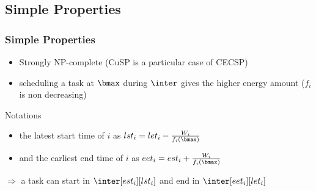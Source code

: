 \subsection{Simple Properties}
\begin{frame}
  \frametitle{Simple Properties}
  \begin{itemize}
\vfill
  \item Strongly NP-complete (CuSP is a particular case of CECSP)
\vfill
\pause
  \item scheduling a task at $\bmax$ during $\inter$ gives the higher energy amount ($f_i$ is non decreasing)
\vfill
\end{itemize}
\begin{center}
\end{center}
\pause
\vfill
  \begin{block}{Notations}
    \begin{itemize}
    \item the latest start time of $i$ as $lst_i=let_i-\frac{W_i}{f_i(\bmax)}$
    \item and the earliest end time of $i$ as $eet_i=est_i+\frac{W_i}{f_i(\bmax)}$
    \end{itemize}
  \end{block}
\vfill
  $\Rightarrow$ a task can start in $\inter[est_i][lst_i]$ and end in $\inter[eet_i][let_i]$
\vfill
\end{frame}
